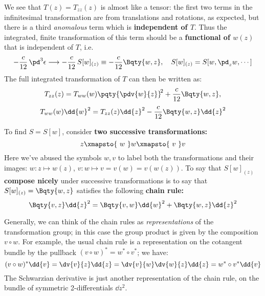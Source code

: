 \documentclass[a4paper
	,10pt
]{article}
\begin{document}
	We see that $T(z) = T_{zz}(z)$ is almost like a tensor: the first two terms in the infinitesimal transformation are from translations and rotations, as expected, but there is a third \textit{anomalous} term which is \textbf{independent of $T$}. Thus the integrated, finite transformation of this term should be a \textbf{functional of $w(z)$} that is independent of $T$, i.e.
	\begin{equation}
		- \frac{c}{12}\,\pd^3 \epsilon
	\longrightarrow
		- \frac{c}{12}\, S[w]_{(z)}
		\equiv - \frac{c}{12} \Bqty{w,z},
	\quad
		S[w]_{(z)} = S[w,\pd_z w,\cdots]
	\end{equation}
	The full integrated transformation of $T$ can then be written as:
	\begin{equation}
		T_{zz}(z)
		= T_{ww}(w) \pqty{\pdv{w}{z}}^{\!2}
			+ \frac{c}{12} \Bqty{w,z},
	\end{equation}
	\vspace{-.6\baselineskip}
	\begin{equation}
		T_{ww}(w) \dd{w}^2
		= T_{zz}(z) \dd{z}^2
			- \frac{c}{12} \Bqty{w,z} \dd{z}^2
	\end{equation}
	
	To find $S = S[w]$, consider \textbf{two successive transformations:}
	\begin{equation}
		z \xmapsto{\ w\ } w \xmapsto{\ v\ } v
	\end{equation}
	Here we've abused the symbols $w,v$ to label both the transformations and their images: $w\colon z\mapsto w(z)$, $v\colon w\mapsto v = v(w) = v(w(z))$. 
	To say that \textbf{$S[w]_{(z)}$ compose nicely} under successive transformations is to say that $S[w]_{(z)} = \Bqty{w,z}$ satisfies the following \textbf{chain rule:}
	\begin{equation}
		\Bqty{v,z} \dd{z}^2
		= \Bqty{v,w} \dd{w}^2
		+ \Bqty{w,z} \dd{z}^2
	\end{equation}
\pagebreak
	
	Generally, we can think of the chain rules as \textit{representations} of the transformation group; in this case the group product is given by the composition $v\circ w$. For example, the usual chain rule is a representation on the cotangent bundle by the pullback $
		(v\circ w)^*
		= w^* \circ v^*
	$; we have:
	\begin{equation}
		(v\circ w)^* \dd{v}
		= \dv{v}{z} \dd{z}
		= \dv{v}{w} \dv{w}{z} \dd{z}
		= w^* \circ v^* \dd{v}
	\end{equation}
	The Schwarzian derivative is just another representation of the chain rule, on the bundle of symmetric 2-differentials $\dd{z}^2$. 
	
\end{document}
